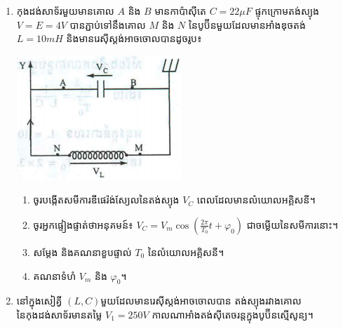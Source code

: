 \documentclass{officialexam}
\begin{document}
\begin{enumerate}[m]
	\item កុងដង់សាទ័រមួយមានគោល $A$ និង $B$ មានកាប៉ាសុីតេ $C=22\mu F$ ផ្ទុកក្រោមតង់ស្យុង $V=E=4V$ បានភ្ជាប់ទៅនឹងគោល $M$ និង $N$ នៃបូប៊ីនមួយដែលមានអាំងឌុចតង់ $L=10mH$ និងមានរេសុីស្តង់អាចចោលបានដូចរូប៖
	\begin{multicols}{2}
		\includegraphics[scale=0.8]{pic02}
		\begin{enumerate}[k]
			\item ចូរបង្កើតសមីការឌីផេរ៉ង់ស្យែលនៃតង់ស្យុង $V_C$ ពេលដែលមានលំយោលអគ្គិសនី។
			\item ចូរអ្នកផ្ទៀងផ្ទាត់ថាអនុគមន៍៖
			$V_C=V_m\cos\left(\frac{2\pi}{T_0}t+\varphi_0\right)$ ជាចម្លើយនៃសមីការនោះ។
			\item សម្ដែង និងគណនាខួបផ្ទាល់ $T_0$ នៃលំយោលអគ្គិសនី។
			\item គណនាទំហំ $V_m$ និង $\varphi_0$។
		\end{enumerate}
	\end{multicols}
	\item នៅក្នុងសៀគ្វី $\left(L, C\right)$​មួយដែលមានរេសុីស្តង់អាចចោលបាន តង់ស្យុងរវាងគោលនៃកុងដង់សាទ័រមានតម្លៃ $V_1=250V$ កាលណាអាំងតង់សុីតេចរន្តក្នុងបូប៊ីនស្មើសូន្យ។\\

\end{enumerate}
\end{document}
